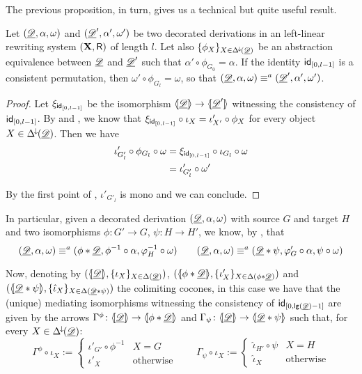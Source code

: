 The previous proposition, in turn, gives us a technical but quite useful result.

\begin{corollary}\label{cor:fromsemitocons}
			Let $(\underline{\mathscr{D}}, \alpha, \omega)$ and $(\underline{\mathscr{D}}', \alpha', \omega')$ be two decorated derivations in an left-linear rewriting system $(\textbf {\textup{X}}, \mathsf{R})$ of length $l$. Let also $\{\phi_X\}_{X\in \Delta^{\hspace{-1pt}\downarrow\hspace{-1pt}}(\underline{\mathscr{D}})}$ be an abstraction equivalence between $\underline{\mathscr{D}}$ and $\underline{\mathscr{D}}'$ such that  $\alpha'\circ \phi_{G_0}=\alpha$. If  the identity $\mathsf{id}_{[0,l-1]}$ is a consistent permutation, then $\omega'\circ \phi_{G_l}=\omega$, so that $(\underline{\mathscr{D}}, \alpha, \omega) \equiv^a (\underline{\mathscr{D}}', \alpha', \omega')$.
\end{corollary}
\begin{proof}
	Let $\xi_{\mathsf{id}_{[0, l-1]}}$ be the isomorphism $\langle \hspace{-1.85pt}[ \underline{\mathscr{D}}]\hspace{-1.85pt}\rangle\to \langle \hspace{-1.85pt}[\underline{\mathscr{D}}']\hspace{-1.85pt}\rangle$ witnessing the consistency of $\mathsf{id}_{[0, l-1]}$. By  and , we know that $\xi_{\mathsf{id}_{[0,l-1]}} \circ \iota_{X}= \iota'_{X'}\circ \phi_X$ for every object $X\in \Delta^{\hspace{-1pt}\downarrow\hspace{-1pt}}(\underline{\mathscr{D}})$. Then we have
	\begin{align*}
		\iota'_{ G'_{l}}\circ \phi_{G_l}\circ \omega&=\xi_{\mathsf{id}_{[0, l-1]}}\circ \iota_{G_l}\circ \omega\\&=\iota'_{G'_l}\circ \omega'
	\end{align*}
	
	By the first point of , $\iota'_{ G'_{l}}$ is mono and we can conclude.
\end{proof}


\begin{remark}\label{rem:abscons2}
	In particular, given a decorated derivation $(\underline{\mathscr{D}}, \alpha, \omega)$ with source $G$ and target $H$ and two isomorphisms $\phi\colon G'\to G$, $\psi\colon H\to H'$, we know, by , that 
	\[(\underline{\mathscr{D}}, \alpha, \omega) \equiv^a (\phi * \underline{\mathscr{D}}, \phi^{-1}\circ \alpha,   \varphi^{-1}_{H} \circ \omega) \qquad (\underline{\mathscr{D}}, \alpha, \omega) \equiv^a ( \underline{\mathscr{D}}*\psi, \varphi'_{G} \circ \alpha, \psi \circ \omega )\]
	
	Now, denoting by $(\langle \hspace{-1.85pt}[ \underline{\mathscr{D}}]\hspace{-1.85pt}\rangle, \{\iota_X\}_{X\in \Delta(\underline{\mathscr{D}})})$, $(\langle \hspace{-1.85pt}[ \phi *\underline{\mathscr{D}} ]\hspace{-1.85pt}\rangle, \{\iota'_X\}_{X\in \Delta(\phi *\underline{\mathscr{D}})})$ and $(\langle \hspace{-1.85pt}[ \underline{\mathscr{D}}*\psi ]\hspace{-1.85pt}\rangle, \{\hat{\iota}_X\}_{X\in \Delta(\underline{\mathscr{D}}*\psi)})$ the colimiting cocones, in this case we have that the (unique) mediating isomorphisms witnessing the consistency of $\mathsf{id}_{[0, \mathsf{lg}(\underline{\mathscr{D}})-1]}$ are given by the arrows $\Gamma^{\phi} \colon \langle \hspace{-1.85pt}[ \underline{\mathscr{D}}]\hspace{-1.85pt}\rangle\to \langle \hspace{-1.85pt}[ \phi*\underline{\mathscr{D}} ]\hspace{-1.85pt}\rangle$ and $\Gamma_\psi\colon \langle \hspace{-1.85pt}[ \underline{\mathscr{D}}]\hspace{-1.85pt}\rangle\to \langle \hspace{-1.85pt}[ \underline{\mathscr{D}}*\psi ]\hspace{-1.85pt}\rangle$  such that, for every $X\in \Delta^{\hspace{-1pt}\downarrow\hspace{-1pt}}(\underline{\mathscr{D}})$:
	\[\Gamma^\phi \circ \iota_X:=\begin{cases}
		\iota'_{G'}\circ \phi^{-1}  & X=G\\
		\iota'_X & \text{otherwise}
	\end{cases} \qquad \Gamma_\psi \circ \iota_X:=\begin{cases}
		\hat{\iota}_{H'}\circ \psi  & X=H\\
		\hat{\iota}_X & \text{otherwise}
	\end{cases}\]
\end{remark}


